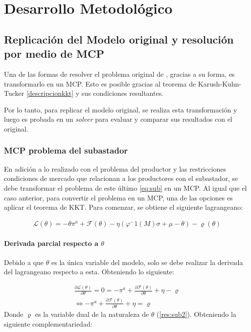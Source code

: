 
\chapter{Desarrollo Metodológico} \label{c3} %


\section{Replicación del Modelo original y resolución por medio de MCP}

Una de las formas de resolver el problema original de , gracias a su forma, es transformarlo en un MCP. Esto es posible gracias al teorema de Karush-Kuhn-Tucker \ref{descripcionkkt} y sus condiciones resultantes. 
\vspace{2.5mm}

Por lo tanto, para replicar el modelo original, se realiza esta transformación y luego es probada en un \textit{solver} para evaluar y comparar sus resultados con el original.

\subsection{MCP problema del subastador}\label{MCPsubastador}

En adición a lo realizado con el problema del productor y las restricciones condiciones de mercado que relacionan a los productores con el subastador, se debe transformar el problema de este último \ref{eq:sub} en un MCP. Al igual que el caso anterior, para convertir el problema en un MCP, una de las opciones es aplicar el teorema de KKT. Para comenzar, se obtiene el siguiente lagrangeano:

\footnotesize{
\begin{align}
\mathcal{L}(\theta) = -\theta\pi^a + \mathcal{F}(\theta) - \eta (\varphi^-1(M)\sigma+\mu-\theta) - \varrho(\theta)  \label{eq:lagrange2}
\end{align}}

\subsubsection{Derivada parcial respecto a $\theta$}

Debido a que $\theta$ es la única variable del modelo, solo se debe realizar la derivada del lagrangeano respecto a esta. Obteniendo lo siguiente:

\footnotesize{
\begin{align}
    \frac{\partial \mathcal{L}(\theta) }{\partial \theta} = 0 =  -\pi^a + \frac{\partial\mathcal{F}(\theta)}{\partial \theta} + \eta - \varrho \\
    \Leftrightarrow -\pi^a + \frac{\partial\mathcal{F}(\theta)}{\partial \theta} + \eta = \varrho \label{kkt:subastadororiginal}
\end{align}
}
Donde $\varrho$ es la variable dual de la naturaleza de $\theta$ (\ref{res:sub2}). Obteniendo la siguiente complementariedad:

